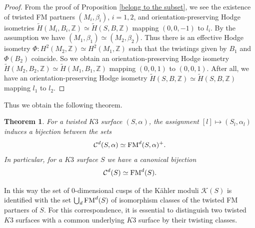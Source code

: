 \documentclass{article}
\theoremstyle{plain}
\newtheorem{theorem}{Theorem}[section]
\theoremstyle{definition}
\theoremstyle{remark}
\newcommand{\Z}{{\mathbb Z}}
\begin{document}
\begin{proof}
From the proof of Proposition \ref{belong to the subset}, 
we see the existence of twisted FM partners 
$(M_{i}, \beta _{i})$, $i=1, 2$, 
and orientation-preserving Hodge isometries 
$\widetilde{H}(M_{i}, B_{i}, {\Z}) \simeq \widetilde{H}(S, B, {\Z})$ 
mapping 
$(0, 0, -1)$ to $l_{i}$. 
By the assumption 
we have 
$(M_{1}, \beta _{1}) \simeq (M_{2}, \beta _{2})$. 
Thus 
there is an effective Hodge isometry 
$\Phi : H^{2}(M_{2}, {\Z}) \simeq H^{2}(M_{1}, {\Z})$ 
such that 
the twistings given by 
$B_{1}$ and $\Phi (B_{2})$ coincide. 
So 
we obtain an orientation-preserving Hodge isometry 
$\widetilde{H}(M_{2}, B_{2}, {\Z}) \simeq \widetilde{H}(M_{1}, B_{1}, {\Z})$ 
mapping 
$(0, 0, 1)$ to $(0, 0, 1)$. 
After all, 
we have an orientation-preserving Hodge isometry 
$\widetilde{H}(S, B, {\Z}) \simeq \widetilde{H}(S, B, {\Z})$ 
mapping 
$l_{1}$ to $l_{2}$. 
\end{proof}





Thus we obtain the following theorem. 



\begin{theorem}\label{most general}
For a twisted $K3$ surface $(S, \alpha )$, 
the assignment 
$[l] \mapsto (S_{l}, \alpha _{l})$ 
induces a bijection between 
the sets 
\begin{equation*}
\mathcal{C}^{d}(S, \alpha ) 
\simeq 
{\rm FM\/}^{d}(S, \alpha )^{+}. 
\end{equation*}
In particular, 
for a $K3$ surface $S$  
we have a canonical bijection 
\begin{equation*}
\mathcal{C}^{d}(S) 
\simeq 
{\rm FM\/}^{d}(S). 
\end{equation*}
\end{theorem}




In this way  
the set of $0$-dimensional cusps of 
the K\"ahler moduli  
$\mathcal{K}(S)$  
is identified with the set 
$\mathop{\bigcup}_{d} {\rm FM\/}^{d}(S)$ 
of isomorphism classes of the twisted FM partners of $S$.  
For this correspondence,  
it is essential to distinguish two twisted $K3$ surfaces with a common underlying $K3$ surface 
by their twisting classes.     
\end{document}
